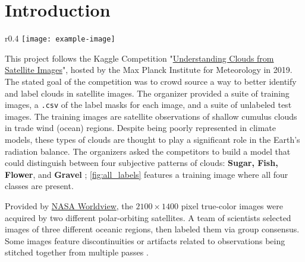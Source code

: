 \section{Introduction}
\begin{wrapfigure}{r}{0.4\textwidth}
    \centering
    \texttt{[image: example-image]}
    \caption{A labeled training image showing all four types of clouds.}
    \label{fig:all_labels}
\end{wrapfigure}
%
This project follows the Kaggle Competition "\href{https://www.kaggle.com/competitions/understanding_cloud_organization/overview}{Understanding Clouds from Satellite Images}", hosted by the Max Planck Institute for Meteorology in 2019. The stated goal of the competition was to crowd source a way to better identify and label clouds in satellite images. The organizer provided a suite of training images, a \texttt{.csv} of the label masks for each image, and a suite of unlabeled test images. The training images are satellite observations of shallow cumulus clouds in trade wind (ocean) regions. Despite being poorly represented in climate models, these types of clouds are thought to play a significant role in the Earth's radiation balance. The organizers asked the competitors to build a model that could distinguish between four subjective patterns of clouds: \textbf{Sugar, Fish, Flower}, and \textbf{Gravel} \cite{rasp_CombiningCrowdsourcingDeep_2020, maxplanckinstituteformeteorology_UnderstandingCloudsSatellite_}; \cref{fig:all_labels} features a training image where all four classes are present. 

Provided by \href{https://worldview.earthdata.nasa.gov/}{NASA Worldview}, the \(2100 \times 1400\) pixel true-color images were acquired by two different polar-orbiting satellites.  A team of scientists selected images of three different oceanic regions, then labeled them via group consensus. Some images feature discontinuities or artifacts related to observations being stitched together from multiple passes \cite{maxplanckinstituteformeteorology_UnderstandingCloudsSatellite_}. 
%
